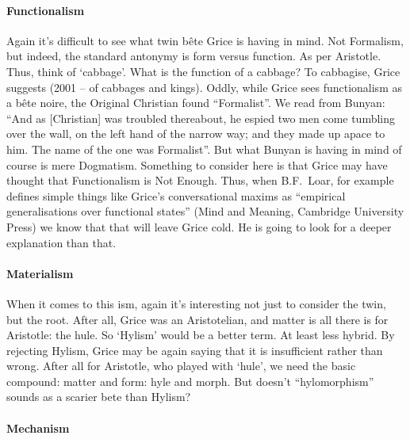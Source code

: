\documentclass[10pt,titlepage]{book}
\begin{document}
{\paragraph{Functionalism}

Again it’s difficult to see what twin bête Grice is having 
in mind. Not  Formalism, but indeed, the standard antonymy is form versus 
function. As per  Aristotle. Thus, think of ‘cabbage’. What is the function 
of a cabbage? To  cabbagise, Grice suggests (2001 – of cabbages and kings). 
Oddly, while Grice  sees functionalism as a bête noire, the Original 
Christian found “Formalist”. We  read from Bunyan: “And as [Christian] was troubled 
thereabout, he espied  two men come tumbling over the wall, on the left 
hand of the narrow way; and  they made up apace to him. The name of the one was 
Formalist”. But what Bunyan  is having in mind of course is mere Dogmatism. 
Something to consider here is  that Grice may have thought that 
Functionalism is Not Enough. Thus, when B.F.~Loar, for example defines simple things 
like Grice’s conversational maxims as  “empirical generalisations over 
functional states” (Mind and Meaning, Cambridge  University Press) we know that 
that will leave Grice cold. He is going to look  for a deeper explanation 
than that. 

\paragraph{Materialism}

When  it comes to this ism, again it’s interesting not just to 
consider the twin, but  the root. After all, Grice was an Aristotelian, and 
matter is all there is for  Aristotle: the hule. So ‘Hylism’ would be a 
better term. At least less hybrid.  By rejecting Hylism, Grice may be again 
saying that it is insufficient rather  than wrong. After all for Aristotle, 
who played with ‘hule’, we need the basic  compound: matter and form: hyle 
and morph. But doesn’t “hylomorphism” sounds as  a scarier bete than Hylism? 

\paragraph{Mechanism}

}
\end{document}
